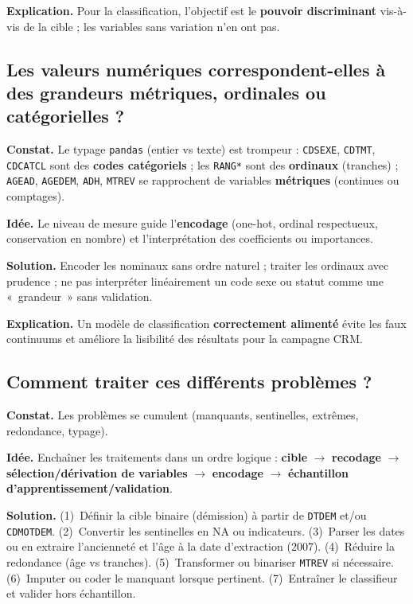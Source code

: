 \documentclass[11pt,a4paper]{article}
\begin{document}
\textbf{Explication.} Pour la classification, l'objectif est le \textbf{pouvoir discriminant} vis-à-vis de la cible ; les variables sans variation n'en ont pas.

\subsection{Les valeurs numériques correspondent-elles à des grandeurs métriques, ordinales ou catégorielles ?}

\textbf{Constat.} Le typage \texttt{pandas} (entier vs texte) est trompeur : \texttt{CDSEXE}, \texttt{CDTMT}, \texttt{CDCATCL} sont des \textbf{codes catégoriels} ; les \texttt{RANG*} sont des \textbf{ordinaux} (tranches) ; \texttt{AGEAD}, \texttt{AGEDEM}, \texttt{ADH}, \texttt{MTREV} se rapprochent de variables \textbf{métriques} (continues ou comptages).

\textbf{Idée.} Le niveau de mesure guide l'\textbf{encodage} (one-hot, ordinal respectueux, conservation en nombre) et l'interprétation des coefficients ou importances.

\textbf{Solution.} Encoder les nominaux sans ordre naturel ; traiter les ordinaux avec prudence ; ne pas interpréter linéairement un code sexe ou statut comme une «~grandeur~» sans validation.

\textbf{Explication.} Un modèle de classification \textbf{correctement alimenté} évite les faux continuums et améliore la lisibilité des résultats pour la campagne CRM.

\subsection{Comment traiter ces différents problèmes ?}

\textbf{Constat.} Les problèmes se cumulent (manquants, sentinelles, extrêmes, redondance, typage).

\textbf{Idée.} Enchaîner les traitements dans un ordre logique : \textbf{cible} $\rightarrow$ \textbf{recodage} $\rightarrow$ \textbf{sélection/dérivation de variables} $\rightarrow$ \textbf{encodage} $\rightarrow$ \textbf{échantillon d'apprentissement/validation}.

\textbf{Solution.} (1)~Définir la cible binaire (démission) à partir de \texttt{DTDEM} et/ou \texttt{CDMOTDEM}. (2)~Convertir les sentinelles en NA ou indicateurs. (3)~Parser les dates ou en extraire l'ancienneté et l'âge à la date d'extraction (2007). (4)~Réduire la redondance (âge vs tranches). (5)~Transformer ou binariser \texttt{MTREV} si nécessaire. (6)~Imputer ou coder le manquant lorsque pertinent. (7)~Entraîner le classifieur et valider hors échantillon.
\end{document}

